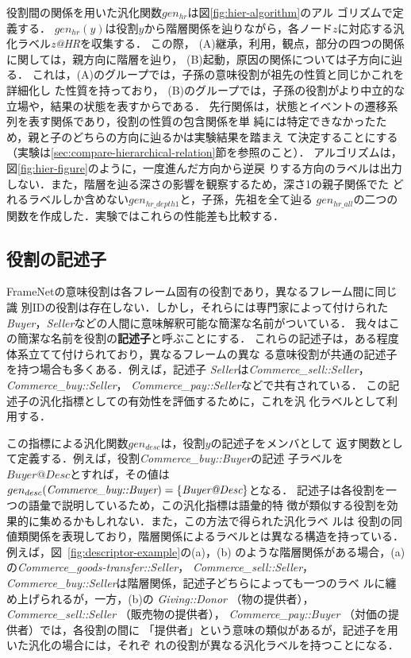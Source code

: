 \documentclass[japanese]{jnlp_1.4}
\begin{document}
役割間の関係を用いた汎化関数$gen_{hr}$は図\ref{fig:hier-algorithm}のアル
ゴリズムで定義する．
$gen_{hr}(y)$は役割$y$から階層関係を辿りながら，各ノード$z$に対応する汎
化ラベル{\it z@HR}を収集する．
この際，
(A)継承，利用，観点，部分の四つの関係に関しては，親方向に階層を辿り，
(B)起動，原因の関係については子方向に辿る．
これは，(A)のグループでは，子孫の意味役割が祖先の性質と同じかこれを詳細化し
た性質を持っており，
(B)のグループでは，子孫の役割がより中立的な立場や，結果の状態を表すからである．
先行関係は，状態とイベントの遷移系列を表す関係であり，役割の性質の包含関係を単
純には特定できなかったため，親と子のどちらの方向に辿るかは実験結果を踏まえ
て決定することにする（実験は\ref{sec:compare-hierarchical-relation}節を参照のこと）．
アルゴリズムは，図\ref{fig:hier-figure}のように，一度進んだ方向から逆戻
りする方向のラベルは出力しない．また，階層を辿る深さの影響を観察するため，深さ1の親子関係でた
どれるラベルしか含めない$gen_{hr\_depth1}$と，子孫，先祖を全て辿る
$gen_{hr\_all}$の二つの関数を作成した．実験ではこれらの性能差も比較する．


\subsection{役割の記述子}
\label{role-label}

FrameNetの意味役割は各フレーム固有の役割であり，異なるフレーム間に同じ識
別IDの役割は存在しない．しかし，それらには専門家によって付けられた
{\it Buyer}，{\it Seller}などの人間に意味解釈可能な簡潔な名前がついている．
我々はこの簡潔な名前を役割の{\bf 記述子}と呼ぶことにする．
これらの記述子は，ある程度体系立てて付けられており，異なるフレームの異な
る意味役割が共通の記述子を持つ場合も多くある．例えば，記述子{\it
Seller}は{\it Commerce\_sell::Seller}，{\it Commerce\_buy::Seller}，{\it
Commerce\_pay::Seller}などで共有されている．
この記述子の汎化指標としての有効性を評価するために，これを汎
化ラベルとして利用する．

この指標による汎化関数$gen_{desc}$は，役割$y$の記述子をメンバとして
返す関数として定義する．例えば，役割{\it Commerce\_buy::Buyer}の記述
子ラベルを$Buyer@Desc$とすれば，その値は
$gen_{desc}(\mbox{\it Commerce\_buy::Buyer}) = \{\mbox{\it Buyer@Desc}\}$となる．
記述子は各役割を一つの語彙で説明しているため，この汎化指標は語彙的特
徴が類似する役割を効果的に集めるかもしれない．また，この方法で得られた汎化ラベ
ルは
役割の同値類関係を表現しており，階層関係によるラベルとは異なる構造を持っている．
例えば，図~\ref{fig:descriptor-example}の(a)，(b)
のような階層関係がある場合，(a)の{\it Commerce\_goods-transfer::Seller}，
{\it Commerce\_sell::Seller}，
{\it Commerce\_buy::Seller}は階層関係，記述子どちらによっても一つのラベ
ルに纏め上げられるが，一方，(b)の{\it
Giving::Donor} （物の提供者），{\it Commerce\_sell::Seller} （販売物の提供者），{\it
Commerce\_pay::Buyer} （対価の提供者）では，各役割の間に
「提供者」という意味の類似があるが，記述子を用いた汎化の場合には，それぞ
れの役割が異なる汎化ラベルを持つことになる．
\end{document}
